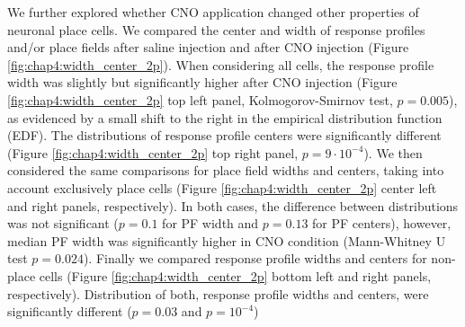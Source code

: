 We further explored whether CNO application changed other properties of neuronal place cells.
We compared the center and width of response profiles and/or place fields after saline injection and after CNO injection (Figure \ref{fig:chap4:width_center_2p}).
When considering all cells, the response profile width was slightly but significantly higher after CNO injection (Figure \ref{fig:chap4:width_center_2p} top left panel, Kolmogorov-Smirnov test, $p=0.005$), as evidenced by a small shift to the right in the empirical distribution function (EDF).
The distributions of response profile centers were significantly different (Figure \ref{fig:chap4:width_center_2p} top right panel, $p=9\cdot 10^{-4}$).
We then considered the same comparisons for place field widths and centers, taking into account exclusively place cells (Figure \ref{fig:chap4:width_center_2p} center left and right panels, respectively). 
In both cases, the difference between distributions was not significant ($p=0.1$ for PF width and $p=0.13$ for PF centers), however, median PF width was significantly higher in CNO condition (Mann-Whitney  U  test $p=0.024$).
Finally we compared response profile widths and centers for non-place cells (Figure \ref{fig:chap4:width_center_2p} bottom left and right panels, respectively).
Distribution of both, response profile widths and centers, were significantly different ($p=0.03$ and $p=10^{-4}$)   

